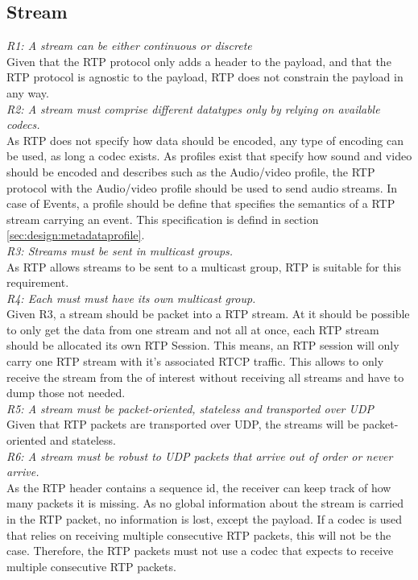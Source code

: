 \subsection{Stream}
\textit{R1: A stream can be either continuous or discrete} \\
Given that the RTP protocol only adds a header to the payload, and that the RTP protocol is agnostic to the payload, RTP does not constrain the payload in any way.\\

\noindent\textit{R2: A stream must comprise different datatypes only by relying on available codecs.}\\
As RTP does not specify how data should be encoded, any type of encoding can be used, as long a codec exists. As profiles exist that specify how sound and video should be encoded and describes such as the Audio/video profile, the RTP protocol with the Audio/video profile should be used to send audio streams. In case of Events, a profile should be define that specifies the semantics of a RTP stream carrying an event. This specification is defind in section \ref{sec:design:metadataprofile}. \\

\noindent\textit{R3: Streams must be sent in multicast groups.}\\
As RTP allows streams to be sent to a multicast group, RTP is suitable for this requirement. \\

\noindent\textit{R4: Each must must have its own multicast group.}\\
Given R3, a stream should be packet into a RTP stream. At it should be possible to only get the data from one stream and not all at once, each RTP stream should be allocated its own RTP Session. This means, an RTP session will only carry one RTP stream with it's associated RTCP traffic. This allows  to only receive the stream from the  of interest without receiving all streams and have to dump those not needed.\\

\noindent\textit{R5: A stream must be packet-oriented, stateless and transported over UDP} \\
Given that RTP packets are transported over UDP, the streams will be packet-oriented and stateless.\\

\noindent\textit{R6: A stream must be robust to UDP packets that arrive out of order or never arrive.} \\
As the RTP header contains a sequence id, the receiver can keep track of how many packets it is missing. As no global information about the stream is carried in the RTP packet, no information is lost, except the payload. If a codec is used that relies on receiving multiple consecutive RTP packets, this will not be the case. Therefore, the RTP packets must not use a codec that expects to receive multiple consecutive RTP packets. \\

